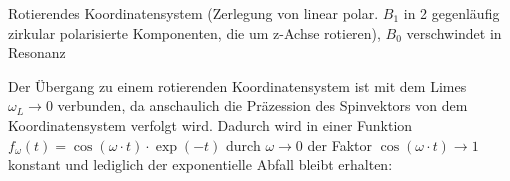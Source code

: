 \documentclass{subfiles}
\begin{document}
    \begin{Frage}
        Rotierendes Koordinatensystem (Zerlegung von linear polar. $B_1$ in 2 gegenläufig zirkular polarisierte Komponenten, die um z-Achse rotieren), $B_0$ verschwindet in Resonanz
    \end{Frage}
    \begin{Antwort}
        Der Übergang zu einem rotierenden Koordinatensystem ist mit dem Limes $\omega_L\to 0$ verbunden, da anschaulich die Präzession des Spinvektors von dem Koordinatensystem verfolgt wird. Dadurch wird in einer Funktion $f_\omega(t) = \cos(\omega\cdot t)\cdot\exp(-t)$ durch $\omega\to 0$ der Faktor $\cos(\omega\cdot t)\to 1$ konstant und lediglich der exponentielle Abfall bleibt erhalten:
        \begin{figure}[H]
            \centering
        \end{figure}
    \end{Antwort}
\end{document}
